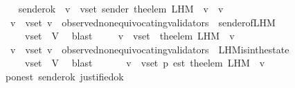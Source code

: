 \begin{isabellebody}
\ \ \isamarkupfalse%
\ sender{\isacharunderscore}ok{\isacharcolon}\ {\isachardoublequoteopen}{\isasymforall}\ v\ {\isasymin}\ v{\isacharunderscore}set{\isachardot}\ sender\ {\isacharparenleft}the{\isacharunderscore}elem\ {\isacharparenleft}L{\isacharunderscore}H{\isacharunderscore}M\ {\isasymsigma}\ v{\isacharparenright}{\isacharparenright}\ {\isacharequal}\ v{\isachardoublequoteclose}\ \isanewline
\ \ \ \ \isamarkupfalse%
\ {\isacartoucheopen}{\isasymforall}\ v\ {\isasymin}\ v{\isacharunderscore}set{\isachardot}\ v\ {\isasymin}\ observed{\isacharunderscore}non{\isacharunderscore}equivocating{\isacharunderscore}validators\ {\isasymsigma}{\isacartoucheclose}\ sender{\isacharunderscore}of{\isacharunderscore}L{\isacharunderscore}H{\isacharunderscore}M\isanewline
\ \ \ \ \isamarkupfalse%
\ {\isacartoucheopen}{\isasymsigma}\ {\isasymin}\ {\isasymSigma}\ {\isasymand}\ v{\isacharunderscore}set\ {\isasymsubseteq}\ V{\isacartoucheclose}\ \isamarkupfalse%
\ blast\isanewline
\ \ \isamarkupfalse%
\ {\isachardoublequoteopen}{\isasymforall}\ v\ {\isasymin}\ v{\isacharunderscore}set{\isachardot}\ \ the{\isacharunderscore}elem\ {\isacharparenleft}L{\isacharunderscore}H{\isacharunderscore}M\ {\isasymsigma}\ v{\isacharparenright}\ {\isasymin}\ {\isasymsigma}{\isachardoublequoteclose}\isanewline
\ \ \ \ \isamarkupfalse%
\ {\isacartoucheopen}{\isasymforall}\ v\ {\isasymin}\ v{\isacharunderscore}set{\isachardot}\ v\ {\isasymin}\ observed{\isacharunderscore}non{\isacharunderscore}equivocating{\isacharunderscore}validators\ {\isasymsigma}{\isacartoucheclose}\ L{\isacharunderscore}H{\isacharunderscore}M{\isacharunderscore}is{\isacharunderscore}in{\isacharunderscore}the{\isacharunderscore}state\isanewline
\ \ \ \ \isamarkupfalse%
\ {\isacartoucheopen}{\isasymsigma}\ {\isasymin}\ {\isasymSigma}\ {\isasymand}\ v{\isacharunderscore}set\ {\isasymsubseteq}\ V{\isacartoucheclose}\ \isamarkupfalse%
\ blast\isanewline
\ \ \isamarkupfalse%
\ \isamarkupfalse%
\ {\isachardoublequoteopen}{\isasymforall}\ v\ {\isasymin}\ v{\isacharunderscore}set{\isachardot}\ p\ {\isacharparenleft}est\ {\isacharparenleft}the{\isacharunderscore}elem\ {\isacharparenleft}L{\isacharunderscore}H{\isacharunderscore}M\ {\isasymsigma}\ v{\isacharparenright}{\isacharparenright}{\isacharparenright}{\isachardoublequoteclose}\isanewline
\ \ \ \ \isamarkupfalse%
\ p{\isacharunderscore}on{\isacharunderscore}est\ sender{\isacharunderscore}ok\ justified{\isacharunderscore}ok\isanewline

\end{isabellebody}
